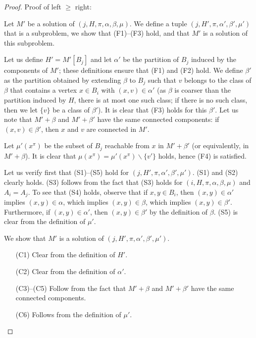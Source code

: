 \begin{proof}
Proof of left \(\geq\) right:

Let \(M'\) be a solution of \((j, H, \pi, \alpha, \beta, \mu)\). We define a tuple \((j, H', \pi, \alpha', \beta', \mu')\) that is a subproblem, we show that (F1)–(F3) hold, and that \(M'\) is a solution of this subproblem.

Let us define \(H' = M'[B_j]\) and let \(\alpha'\) be the partition of \(B_j\) induced by the components of \(M'\); these definitions ensure that (F1) and (F2) hold. We define \(\beta'\) as the partition obtained by extending \(\beta\) to \(B_j\) such that \(v\) belongs to the class of \(\beta\) that contains a vertex \(x \in B_i\) with \((x, v) \in \alpha'\) (as \(\beta\) is coarser than the partition induced by \(H\), there is at most one such class; if there is no such class, then we let \(\{v\}\) be a class of \(\beta'\)). It is clear that (F3) holds for this \(\beta'\). Let us note that \(M' + \beta\) and \(M' + \beta'\) have the same connected components: if \((x, v) \in \beta'\), then \(x\) and \(v\) are connected in \(M'\). 

Let \(\mu'(x^\pi)\) be the subset of \(B_j\) reachable from \(x\) in \(M' + \beta'\) (or equivalently, in \(M' + \beta\)). It is clear that \(\mu(x^\pi) = \mu'(x^\pi) \backslash \{v'\}\) holds, hence (F4) is satisfied.

Let us verify first that (S1)–(S5) hold for \((j, H', \pi, \alpha', \beta', \mu')\). (S1) and (S2) clearly holds. (S3) follows from the fact that (S3) holds for \((i, H, \pi, \alpha, \beta, \mu)\) and \(A_i = A_j\). To see that (S4) holds, observe that if \(x, y \in B_i\), then \((x, y) \in \alpha'\) implies \((x, y) \in \alpha\), which implies \((x, y) \in \beta\), which implies \((x, y) \in \beta'\). Furthermore, if \((x, y) \in \alpha'\), then \((x, y) \in \beta'\) by the definition of \(\beta\). (S5) is clear from the definition of \(\mu'\).

We show that \(M'\) is a solution of \((j, H', \pi, \alpha', \beta', \mu')\).

\begin{itemize}
    \item[(C1)] Clear from the definition of \(H'\).
    \item[(C2)] Clear from the definition of \(\alpha'\).
    \item[(C3)–(C5)] Follow from the fact that \(M' + \beta\) and \(M' + \beta'\) have the same connected components.
    \item[(C6)] Follows from the definition of \(\mu'\).
\end{itemize}


\end{proof}
